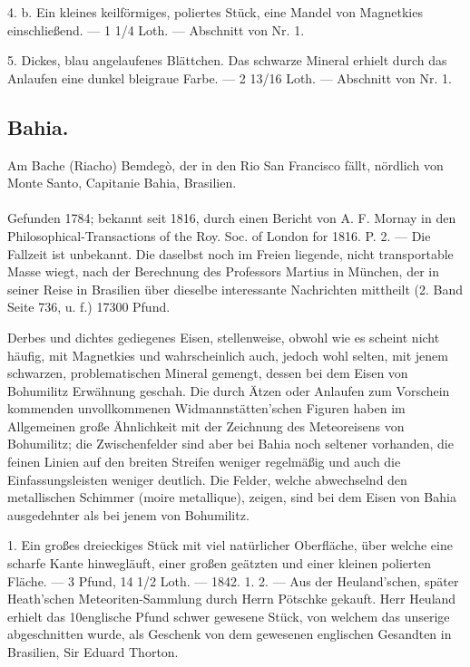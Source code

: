 \documentclass[a4paper, 11pt, oneside, polutonikogreek, german]{article}
\begin{document}
4. b. Ein kleines keilförmiges, poliertes Stück, eine Mandel von Magnetkies einschließend. — 1 1/4 Loth. — Abschnitt von Nr. 1.

5. Dickes, blau angelaufenes Blättchen. Das schwarze Mineral erhielt durch das Anlaufen eine dunkel bleigraue Farbe. — 2 13/16 Loth. — Abschnitt von Nr. 1.
\subsection{Bahia.}
\begin{center}
\small
Am Bache (Riacho) Bemdegò, der in den Rio San Francisco fällt, nördlich von Monte Santo, Capitanie Bahia, Brasilien.
\end{center}
\paragraph{}
Gefunden 1784; bekannt seit 1816, durch einen Bericht von A. F. Mornay in den Philosophical-Transactions of the Roy. Soc. of London for 1816. P. 2. — Die Fallzeit ist unbekannt. Die daselbst noch im Freien liegende, nicht transportable Masse wiegt, nach der Berechnung des Professors Martius in München, der in seiner Reise in Brasilien über dieselbe interessante Nachrichten mittheilt (2. Band Seite 736, u. f.) 17300 Pfund.

Derbes und dichtes gediegenes Eisen, stellenweise, obwohl wie es scheint nicht häufig, mit Magnetkies und wahrscheinlich auch, jedoch wohl selten, mit jenem schwarzen, problematischen Mineral gemengt, dessen bei dem Eisen von Bohumilitz Erwähnung geschah. Die durch Ätzen oder Anlaufen zum Vorschein kommenden unvollkommenen Widmannstätten'schen Figuren haben im Allgemeinen große Ähnlichkeit mit der Zeichnung des Meteoreisens von Bohumilitz; die Zwischenfelder sind aber bei Bahia noch seltener vorhanden, die feinen Linien auf den breiten Streifen weniger regelmäßig und auch die Einfassungsleisten weniger deutlich. Die Felder, welche abwechselnd den metallischen Schimmer (moire metallique), zeigen, sind bei dem Eisen von Bahia ausgedehnter als bei jenem von Bohumilitz.

1. Ein großes dreieckiges Stück mit viel natürlicher Oberfläche, über welche eine scharfe Kante hinwegläuft, einer großen geätzten und einer kleinen polierten Fläche. — 3 Pfund, 14 1/2 Loth. — 1842. 1. 2. — Aus der Heuland'schen, später Heath'schen Meteoriten-Sammlung durch Herrn Pötschke gekauft. Herr Heuland erhielt das 10englische Pfund schwer gewesene Stück, von welchem das unserige abgeschnitten wurde, als Geschenk von dem gewesenen englischen Gesandten in Brasilien, Sir Eduard Thorton.
\end{document}
